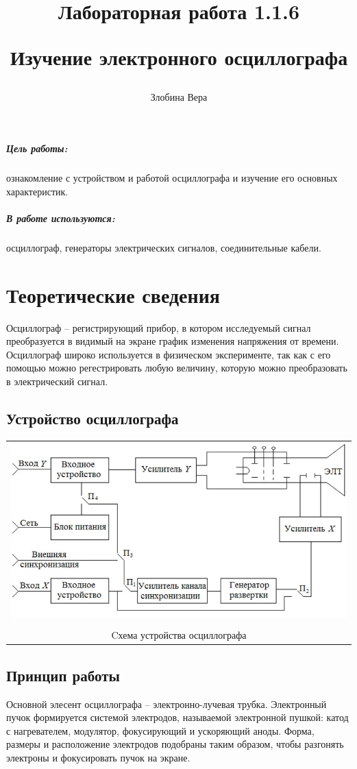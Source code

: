\documentclass[a4paper,12pt]{article}
\author{Злобина Вера}
\title{Лабораторная работа 1.1.6

Изучение электронного осциллографа}
\begin{document}
 	
	
	
	
	\maketitle
	
	\newpage
	
	
	\subparagraph*{Цель работы:} ознакомление с устройством и работой осциллографа и изучение его основных характеристик.
	
	
	\subparagraph*{В работе используются:} осциллограф, генераторы электрических сигналов, соединительные кабели.
	
	\section*{Теоретические сведения}
	
	Осциллограф -- регистрирующий прибор, в котором исследуемый сигнал преобразуется в видимый на экране график изменения напряжения от времени. Осциллограф широко используется в физическом эксперименте, так как с его помощью можно регестрировать любую величину, которую можно преобразовать в электрический сигнал.
	\subsection*{Устройство осциллографа}

	

		\begin{center}
			\begin{tabular}{c}
			
			\includegraphics[width=0.7\linewidth]{pic1.jpg}\\
		\\	Cхема устройства осциллографа
	
	\end{tabular}
		\end{center}

	
	
	
	\subsection*{Принцип работы}
	Основной элесент осциллографа -- электронно-лучевая трубка. Электронный пучок формируется системой электродов, называемой электронной пушкой: катод с нагревателем, модулятор, фокусирующий и ускоряющий аноды. Форма, размеры и расположение электродов подобраны таким образом, чтобы разгонять электроны и фокусировать пучок на экране. 
	
\end{document}
